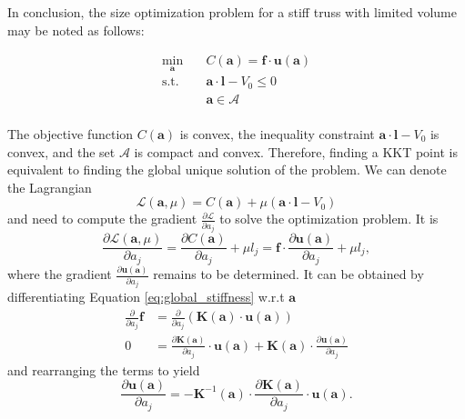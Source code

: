 In conclusion, the size optimization problem for a stiff truss with limited volume may be noted as follows:

\begin{equation}
    \begin{aligned}
        \min_{\mathbf{a}} \quad & C(\mathbf{a}) = \mathbf{f} \cdot \mathbf{u}(\mathbf{a})\\
        \textrm{s.t.} \quad & \mathbf{a} \cdot \mathbf{l} - V_0 \le 0  \\
                            & \mathbf{a} \in \mathcal{A}\\
    \end{aligned}
    \label{eq:size_optimization}
\end{equation}

The objective function $C(\mathbf{a})$ is convex, the inequality constraint $\mathbf{a} \cdot \mathbf{l} - V_0$ is convex, and the set $\mathcal{A}$ is compact and convex. Therefore, finding a KKT point is equivalent to finding the global unique solution of the problem. We can denote the Lagrangian 
\begin{equation}
    \mathcal{L}(\mathbf{a}, \mu) = C(\mathbf{a}) + \mu \left( \mathbf{a} \cdot \mathbf{l} - V_0 \right) 
\end{equation}
and need to compute the gradient $\frac{\partial \mathcal{L}}{\partial a_j}$ to solve the optimization problem. It is 
\begin{equation}
    \frac{\partial \mathcal{L} (\mathbf{a}, \mu)}{\partial a_j} 
    = \frac{\partial C (\mathbf{a})}{\partial a_j} + \mu l_j
    = \mathbf{f} \cdot \frac{\partial \mathbf{u} (\mathbf{a})}{\partial a_j} + \mu l_j,
    \label{eq:lagrange_truss_problem}
\end{equation}
where the gradient $\frac{\partial \mathbf{u} (\mathbf{a})}{\partial a_j}$ remains to be determined. It can be obtained by differentiating Equation \eqref{eq:global_stiffness} w.r.t $\mathbf{a}$
\begin{align}
        \frac{\partial}{\partial a_j} \mathbf{f} &= \frac{\partial}{\partial a_j} \left( \mathbf{K} (\mathbf{a}) \cdot \mathbf{u} (\mathbf{a}) \right) \\
        0 &= \frac{\partial \mathbf{K} (\mathbf{a})}{\partial a_j} \cdot \mathbf{u} (\mathbf{a}) + \mathbf{K} (\mathbf{a}) \cdot \frac{\partial \mathbf{u} (\mathbf{a})}{\partial a_j}
\end{align}
and rearranging the terms to yield
\begin{equation}
    \frac{\partial \mathbf{u} (\mathbf{a})}{\partial a_j} = - \mathbf{K}^{-1}(\mathbf{a}) \cdot \frac{\partial \mathbf{K} (\mathbf{a})}{\partial a_j}  \cdot \mathbf{u} (\mathbf{a}).
\end{equation}
